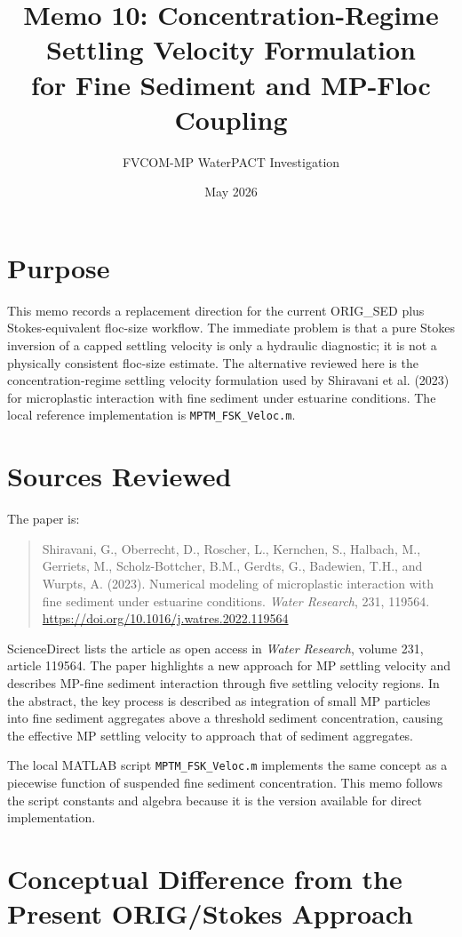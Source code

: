 \documentclass[11pt]{article}
\title{Memo 10: Concentration-Regime Settling Velocity Formulation\\
       for Fine Sediment and MP-Floc Coupling}
\author{FVCOM-MP WaterPACT Investigation}
\date{May 2026}
\begin{document}
\sloppy
\maketitle

\section*{Purpose}

This memo records a replacement direction for the current ORIG\_SED plus
Stokes-equivalent floc-size workflow.  The immediate problem is that a pure
Stokes inversion of a capped settling velocity is only a hydraulic diagnostic;
it is not a physically consistent floc-size estimate.  The alternative reviewed
here is the concentration-regime settling velocity formulation used by
Shiravani et al. (2023) for microplastic interaction with fine sediment under
estuarine conditions.  The local reference implementation is
\texttt{MPTM\_FSK\_Veloc.m}.

\section*{Sources Reviewed}

The paper is:
\begin{quote}
Shiravani, G., Oberrecht, D., Roscher, L., Kernchen, S., Halbach, M.,
Gerriets, M., Scholz-Bottcher, B.M., Gerdts, G., Badewien, T.H., and
Wurpts, A. (2023). Numerical modeling of microplastic interaction with fine
sediment under estuarine conditions. \emph{Water Research}, 231, 119564.
\url{https://doi.org/10.1016/j.watres.2022.119564}
\end{quote}

ScienceDirect lists the article as open access in \emph{Water Research}, volume
231, article 119564.  The paper highlights a new approach for MP settling
velocity and describes MP-fine sediment interaction through five settling
velocity regions.  In the abstract, the key process is described as integration
of small MP particles into fine sediment aggregates above a threshold sediment
concentration, causing the effective MP settling velocity to approach that of
sediment aggregates.

The local MATLAB script \texttt{MPTM\_FSK\_Veloc.m} implements the same
concept as a piecewise function of suspended fine sediment concentration.  This
memo follows the script constants and algebra because it is the version
available for direct implementation.

\section*{Conceptual Difference from the Present ORIG/Stokes Approach}
\end{document}
